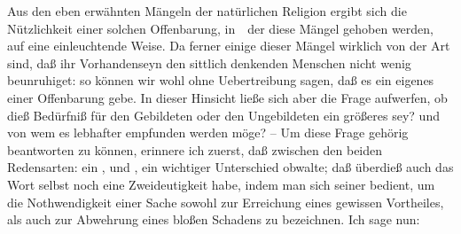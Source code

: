 Aus den eben erwähnten Mängeln der natürlichen Religion ergibt sich die Nützlichkeit einer solchen Offenbarung, in~\ der diese Mängel gehoben werden, auf eine einleuchtende Weise. Da ferner einige dieser Mängel wirklich von der Art sind, daß ihr Vorhandenseyn den sittlich denkenden Menschen nicht wenig beunruhiget: so können wir wohl ohne Uebertreibung sagen, daß es ein eigenes  einer Offenbarung gebe. In dieser Hinsicht ließe sich aber die Frage aufwerfen, ob dieß Bedürfniß für den Gebildeten oder den Ungebildeten ein größeres sey? und von wem es lebhafter empfunden werden möge? -- Um diese Frage gehörig beantworten zu können, erinnere ich zuerst, daß zwischen den beiden Redensarten: ein , und , ein wichtiger Unterschied obwalte; daß überdieß auch das Wort  selbst noch eine Zweideutigkeit habe, indem man sich seiner bedient, um die Nothwendigkeit einer Sache sowohl zur Erreichung eines gewissen Vortheiles, als auch zur Abwehrung eines bloßen Schadens zu bezeichnen. Ich sage nun:
